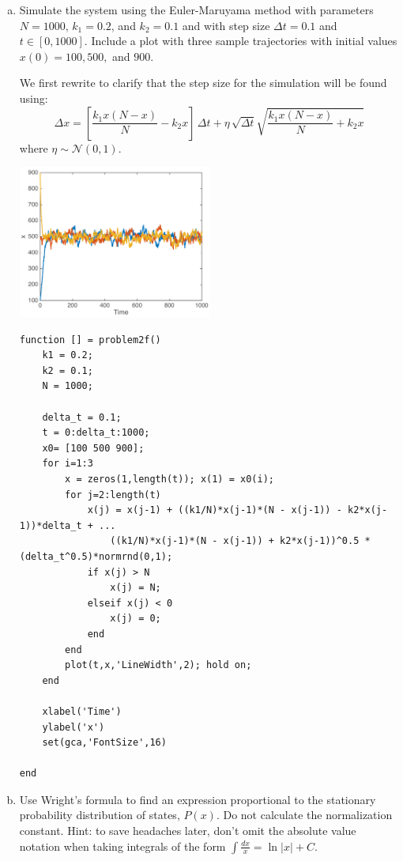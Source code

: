\documentclass{article}
\begin{document}
\begin{enumerate}[a)]
\item Simulate the system using the Euler-Maruyama method with parameters $N=1000$, $k_1 = 0.2$, and $k_2 = 0.1$ and with step size $\Delta t = 0.1$ and $t \in [0,1000]$. Include a plot with three sample trajectories with initial values $x(0)=100,500,$ and $900$.
{\color{red}
We first rewrite to clarify that the step size for the simulation will be found using:
\[ \Delta x =  \left[ \frac{k_1 x(N-x)}{N} - k_2 x \right] \, \Delta t + \eta \, \sqrt{\Delta t} \sqrt{\frac{k_1 x(N-x)}{N} + k_2 x} \]
where $\eta \sim \mathcal{N}(0,1)$.
\begin{center}
\includegraphics[width=0.5\textwidth]{problem2f.pdf}
\end{center}
}
\begin{lstlisting}
function [] = problem2f()
    k1 = 0.2;
    k2 = 0.1;
    N = 1000;
    
    delta_t = 0.1;
    t = 0:delta_t:1000;
    x0= [100 500 900];
    for i=1:3
        x = zeros(1,length(t)); x(1) = x0(i);
        for j=2:length(t)
            x(j) = x(j-1) + ((k1/N)*x(j-1)*(N - x(j-1)) - k2*x(j-1))*delta_t + ...
                ((k1/N)*x(j-1)*(N - x(j-1)) + k2*x(j-1))^0.5 *(delta_t^0.5)*normrnd(0,1);
            if x(j) > N
                x(j) = N;
            elseif x(j) < 0
                x(j) = 0;
            end
        end
        plot(t,x,'LineWidth',2); hold on;
    end
 
    xlabel('Time')
    ylabel('x')
    set(gca,'FontSize',16)
    
end
\end{lstlisting}

\item Use Wright's formula to find an expression proportional to the stationary probability distribution of states, $P(x)$. Do not calculate the normalization constant. Hint: to save headaches later, don't omit the absolute value notation when taking integrals of the form  $\int \frac{dx}{x} = \ln |x|+C$.


\end{enumerate}
\end{document}
